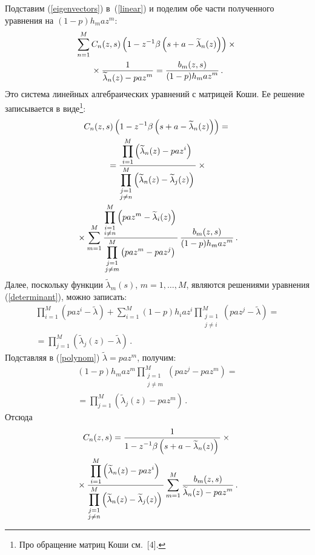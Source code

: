 \begin{multicols}{2}
Подставим (\ref{eigenvectors}) в~(\ref{linear}) и поделим обе части полученного уравнения на $(1-p)h_m az^m$:
\begin{multline*}
\sum\limits_{n=1}^{M}C_n(z,s)\left(1-z^{-1}\beta
\left(s+a-\widetilde{\lambda}_n(z)\right)\right)\times{}\\
{}\times\displaystyle\frac{\displaystyle 1\mathstrut}{\displaystyle \widetilde{\lambda}_n(z)-paz^m\mathstrut}=\displaystyle\frac{\displaystyle b_m(z,s)\mathstrut}{\displaystyle (1-p)h_m az^m\mathstrut}\,.
\end{multline*}
Это система линейных алгебраических уравнений с матрицей Коши. Ее решение записывается в виде\footnote{Про обращение матриц Коши см.~[4].}:
\begin{multline*}
C_n(z,s)\left(1-z^{-1}\beta\left(s+a-\widetilde{\lambda}_n(z)\right)\right)={}\\
{}=
\displaystyle\frac{\displaystyle \prod\limits_{i=1}^M\left(\widetilde{\lambda}_n(z)-paz^i\right)\mathstrut}{\displaystyle \prod\limits_{\substack{j=1\\j\neq n}}^M\left(
\widetilde{\lambda}_n(z)-\widetilde{\lambda}_j(z)\right)\mathstrut}\times{}\\
{}\times
\sum\limits_{m=1}^M\displaystyle\frac{\displaystyle \prod\limits_{\substack{i=1\\i\neq n}}^M
\left(paz^m-\widetilde{\lambda}_i(z)\right)\mathstrut}{\displaystyle \prod\limits_{\substack{j=1\\j\neq m}}^M\left(paz^m-paz^j\right)\mathstrut}\,
\displaystyle\frac{\displaystyle b_m(z,s)\mathstrut}{\displaystyle (1-p)h_m az^m\mathstrut}\,.
\end{multline*}
Далее, поскольку функции $\widetilde{\lambda}_m(s)$, $m=1,\ldots,M$, являются решениями уравнения (\ref{determinant}), можно записать:
\begin{multline}
\prod_{i=1}^M(paz^i-\widetilde{\lambda})+\sum_{i=1}^M(1-p)h_i az^i
\prod\limits_{\substack{j=1\\j\neq i}}^M\left(paz^j-\widetilde{\lambda}\right)={}\\
{}=
\prod_{j=1}^M\left(\widetilde{\lambda}_j(z)-\widetilde{\lambda}\right)\,.\label{polynom}
\end{multline}
Подставляя в (\ref{polynom}) $\widetilde{\lambda}=paz^m$, получим:
\begin{multline*}
(1-p)h_m az^m\prod\limits_{\substack{j=1\\j\neq m}}^M\left(paz^j-paz^m\right)={}\\
{}=\prod_{j=1}^M\left(\widetilde{\lambda}_j(z)-paz^m\right)\,.
\end{multline*}
Отсюда
\begin{multline}
C_n(z,s)=\displaystyle\frac{\displaystyle 1\mathstrut}{\displaystyle 1-z^{-1}\beta\left(s+a-\widetilde{\lambda}_n(z)\right)\mathstrut}\times{}\\
{}\times
\displaystyle\frac{\displaystyle \prod\limits_{i=1}^M\left(\widetilde{\lambda}_n(z)-paz^i\right)\mathstrut}{\displaystyle \prod\limits_{\substack{j=1\\j\neq n}}^M
\left(\widetilde{\lambda}_n(z)-\widetilde{\lambda}_j(z)\right)\mathstrut}
\sum\limits_{m=1}^M\displaystyle\frac{\displaystyle b_m(z,s)\mathstrut}{\displaystyle \widetilde{\lambda}_n(z)-paz^m\mathstrut}\,. \label{C}
\end{multline}


\end{multicols}
